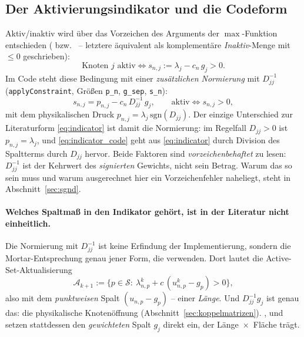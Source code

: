 \documentclass[a4paper,11pt]{article}
\def\tilde#1{#1}%
\newcommand{\code}[1]{\texttt{\small #1}}
\begin{document}
\subsection{Der Aktivierungsindikator und die Codeform}
Aktiv/inaktiv wird über das Vorzeichen des Arguments der $\max$-Funktion entschieden
(\citealt[Gl.~(3.13)]{hueber2005} bzw.\ \citealt[Gl.~(70)]{gitterle} -- letztere äquivalent als komplementäre \emph{Inaktiv}-Menge mit $\le 0$ geschrieben):
\begin{equation}
\text{Knoten } j \text{ aktiv} \iff s_{n,j} := \lambda_j - c_n\,\tilde g_{j} > 0 .
\label{eq:indicator}
\end{equation}
Im Code steht diese Bedingung mit einer \emph{zusätzlichen Normierung} mit $\tilde D_{jj}^{-1}$
(\code{applyConstraint}, Größen \code{p\_n}, \code{g\_sep}, \code{s\_n}):
\begin{equation}
s_{n,j} = p_{n,j} - c_n\,\tilde D_{jj}^{-1}\,\tilde g_{j},
\qquad \text{aktiv} \iff s_{n,j}>0,
\label{eq:indicator_code}
\end{equation}
mit dem physikalischen Druck $p_{n,j}=\lambda_j\,\mathrm{sgn}(\tilde D_{jj})$. Der einzige
Unterschied zur Literaturform \eqref{eq:indicator} ist damit die Normierung: im Regelfall
$\tilde D_{jj}>0$ ist $p_{n,j}=\lambda_j$, und \eqref{eq:indicator_code} geht aus
\eqref{eq:indicator} durch Division des Spaltterms durch $\tilde D_{jj}$ hervor. Beide Faktoren
sind \emph{vorzeichenbehaftet} zu lesen: $\tilde D_{jj}^{-1}$ ist der Kehrwert des
\emph{signierten} Gewichts, nicht sein Betrag. Warum das so sein muss und warum ausgerechnet hier
ein Vorzeichenfehler naheliegt, steht in Abschnitt~\ref{sec:sgnd}.

\paragraph{Welches Spaltmaß in den Indikator gehört, ist in der Literatur nicht einheitlich.}
Die Normierung mit $\tilde D_{jj}^{-1}$ ist keine Erfindung der Implementierung, sondern die
Mortar-Entsprechung genau jener Form, die \citet[Gl.~(3.13)]{hueber2005} verwenden. Dort lautet die
Active-Set-Aktualisierung
\begin{equation}
\mathcal A_{k+1} := \{p\in\mathcal S:\ \lambda^k_{n,p} + c\,(u^k_{n,p}-g_p) > 0\},
\label{eq:hueber_indicator}
\end{equation}
also mit dem \emph{punktweisen} Spalt $(u_{n,p}-g_p)$ -- einer \emph{Länge}. Und $\tilde
D_{jj}^{-1}\tilde g_j$ ist genau das: die physikalische Knotenöffnung
(Abschnitt~\ref{sec:koppelmatrizen}). \citet[Gl.~(55)]{gitterle}, \citet[Gl.~(5.1)]{popp2012} und
\citet[Gl.~(3.58)]{farah} setzen stattdessen den \emph{gewichteten} Spalt $\tilde g_j$ direkt ein,
der Länge~$\times$~Fläche trägt.
\end{document}

